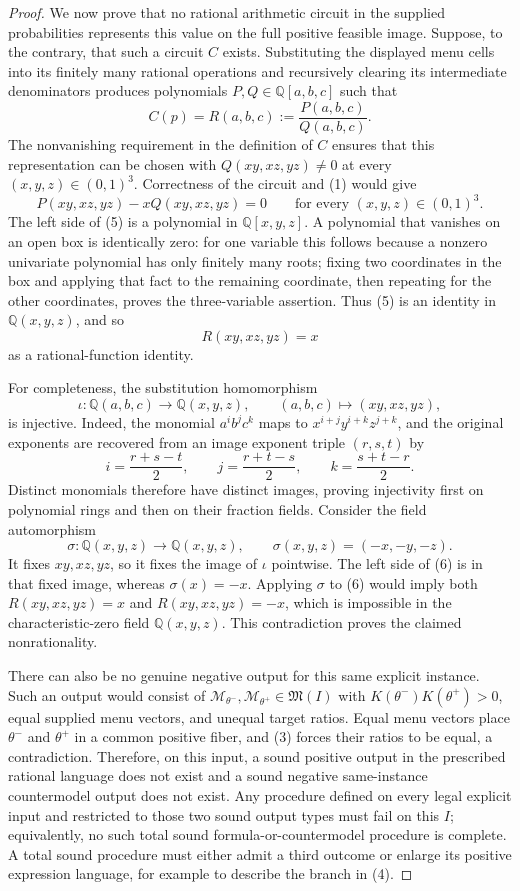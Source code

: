 \documentclass{article}
\begin{document}
\begin{proof}
We now prove that no rational arithmetic circuit in the supplied probabilities represents this value on the full positive feasible image.  Suppose, to the contrary, that such a circuit \(C\) exists.  Substituting the displayed menu cells into its finitely many rational operations and recursively clearing its intermediate denominators produces polynomials \(P,Q\in\mathbb Q[a,b,c]\) such that
\[
 C(p)=R(a,b,c):=\frac{P(a,b,c)}{Q(a,b,c)}.
\]
The nonvanishing requirement in the definition of \(C\) ensures that this representation can be chosen with \(Q(xy,xz,yz)\neq0\) at every \((x,y,z)\in(0,1)^3\).  Correctness of the circuit and (1) would give
\[
 P(xy,xz,yz)-xQ(xy,xz,yz)=0
 \qquad\text{for every }(x,y,z)\in(0,1)^3. \tag{5}
\]
The left side of (5) is a polynomial in \(\mathbb Q[x,y,z]\).  A polynomial that vanishes on an open box is identically zero: for one variable this follows because a nonzero univariate polynomial has only finitely many roots; fixing two coordinates in the box and applying that fact to the remaining coordinate, then repeating for the other coordinates, proves the three-variable assertion.  Thus (5) is an identity in \(\mathbb Q(x,y,z)\), and so
\[
 R(xy,xz,yz)=x \tag{6}
\]
as a rational-function identity.

For completeness, the substitution homomorphism
\[
 \iota:\mathbb Q(a,b,c)\longrightarrow\mathbb Q(x,y,z),
 \qquad (a,b,c)\longmapsto(xy,xz,yz),
\]
is injective.  Indeed, the monomial \(a^ib^jc^k\) maps to \(x^{i+j}y^{i+k}z^{j+k}\), and the original exponents are recovered from an image exponent triple \((r,s,t)\) by
\[
 i=\frac{r+s-t}{2},\qquad
 j=\frac{r+t-s}{2},\qquad
 k=\frac{s+t-r}{2}.
\]
Distinct monomials therefore have distinct images, proving injectivity first on polynomial rings and then on their fraction fields.  Consider the field automorphism
\[
 \sigma:\mathbb Q(x,y,z)\longrightarrow\mathbb Q(x,y,z),
 \qquad \sigma(x,y,z)=(-x,-y,-z).
\]
It fixes \(xy,xz,yz\), so it fixes the image of \(\iota\) pointwise.  The left side of (6) is in that fixed image, whereas \(\sigma(x)=-x\).  Applying \(\sigma\) to (6) would imply both \(R(xy,xz,yz)=x\) and \(R(xy,xz,yz)=-x\), which is impossible in the characteristic-zero field \(\mathbb Q(x,y,z)\).  This contradiction proves the claimed nonrationality.

There can also be no genuine negative output for this same explicit instance.  Such an output would consist of \(\mathcal M_{\theta^-},\mathcal M_{\theta^+}\in\mathfrak M(I)\) with \(K(\theta^-)K(\theta^+)>0\), equal supplied menu vectors, and unequal target ratios.  Equal menu vectors place \(\theta^-\) and \(\theta^+\) in a common positive fiber, and (3) forces their ratios to be equal, a contradiction.  Therefore, on this input, a sound positive output in the prescribed rational language does not exist and a sound negative same-instance countermodel output does not exist.  Any procedure defined on every legal explicit input and restricted to those two sound output types must fail on this \(I\); equivalently, no such total sound formula-or-countermodel procedure is complete.  A total sound procedure must either admit a third outcome or enlarge its positive expression language, for example to describe the branch in (4).


\end{proof}
\end{document}
